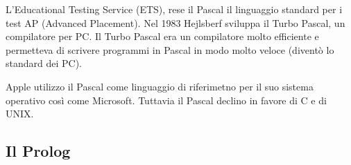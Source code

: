 L'Educational Testing Service (ETS), rese il Pascal il linguaggio standard per i test AP (Advanced Placement).
Nel 1983 Hejlsberf sviluppa il Turbo Pascal, un compilatore per PC. Il Turbo Pascal era un compilatore
molto efficiente e permetteva di scrivere programmi in Pascal in modo molto veloce (diventò lo standard dei PC).

Apple utilizzo il Pascal come linguaggio di riferimetno per il suo sistema operativo così come Microsoft.
Tuttavia il Pascal declino in favore di C e di UNIX.

\subsection{Il Prolog}



